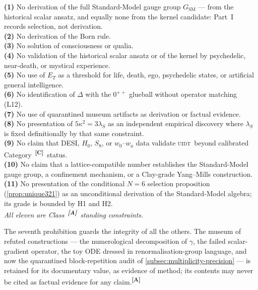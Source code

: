\documentclass[12pt,a4paper,twoside]{article}
\theoremstyle{plain}
\theoremstyle{definition}
\theoremstyle{remark}
\newcommand{\UIDT}{\textsc{uidt}}
\newcommand{\catmark}[1]{\textsuperscript{\textsf{\textbf{[#1]}}}}
\begin{document}
\begin{governancebox}
\textbf{(1)} No derivation of the full Standard-Model gauge group
$G_{\mathrm{SM}}$ --- from the historical scalar ansatz, and equally none from the
kernel candidate: Part~I records selection, not derivation.\\[0.3em]
\textbf{(2)} No derivation of the Born rule.\\[0.3em]
\textbf{(3)} No solution of consciousness or qualia.\\[0.3em]
\textbf{(4)} No validation of the historical scalar ansatz or of the kernel by psychedelic,
near-death, or mystical experience.\\[0.3em]
\textbf{(5)} No use of $E_T$ as a threshold for life, death, ego,
psychedelic states, or artificial general intelligence.\\[0.3em]
\textbf{(6)} No identification of $\Delta$ with the $0^{++}$ glueball
without operator matching (L12).\\[0.3em]
\textbf{(7)} No use of quarantined museum artifacts as derivation or
factual evidence.\\[0.3em]
\textbf{(8)} No presentation of $5\kappa^2 = 3\lambda_S$ as an
independent empirical discovery where $\lambda_S$ is fixed
definitionally by that same constraint.\\[0.3em]
\textbf{(9)} No claim that DESI, $H_0$, $S_8$, or $w_0$--$w_a$ data
validate \UIDT\ beyond calibrated Category~\catmark{C}\
status.\\[0.3em]
\textbf{(10)} No claim that a lattice-compatible number establishes the
Standard-Model gauge group, a confinement mechanism, or a Clay-grade
Yang--Mills construction.\\[0.3em]
\textbf{(11)} No presentation of the conditional $N=6$ selection
proposition (\cref{prop:unique321}) as an unconditional derivation of
the Standard-Model algebra; its grade is bounded by H1 and H2.\\[0.3em]
\emph{All eleven are Class~\catmark{A}\ standing constraints.}
\end{governancebox}

\noindent The seventh prohibition guards the integrity of all the
others. The museum of refuted constructions --- the numerological
decomposition of $\gamma$, the failed scalar-gradient operator, the toy
ODE dressed in renormalisation-group language, and now the quarantined
block-repetition audit of \cref{subsec:multiplicity-precision} --- is
retained for its documentary value, as evidence of method; its contents
may never be cited as factual evidence for any claim.\catmark{A}
\end{document}
